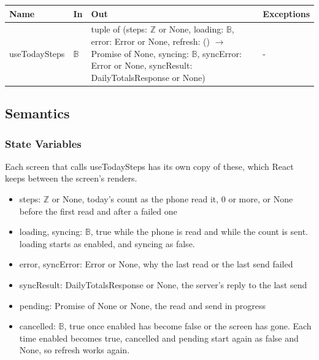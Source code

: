 \documentclass[12pt, titlepage]{article}
\begin{document}
\begin{center}
\small
\setlength{\tabcolsep}{3pt}
\begin{tabular}{>{\raggedright\arraybackslash}p{2.8cm}
  >{\raggedright\arraybackslash}p{1.2cm}
  >{\raggedright\arraybackslash}p{8.6cm}
  >{\raggedright\arraybackslash}p{2.2cm}}
\toprule
\textbf{Name} & \textbf{In} & \textbf{Out} & \textbf{Exceptions} \\
\midrule
useTodaySteps & $\mathbb{B}$ & tuple of (steps: $\mathbb{Z}$ or None, loading:
  $\mathbb{B}$, error: Error or None, refresh: () $\rightarrow$ Promise of
  None, syncing: $\mathbb{B}$, syncError: Error or None, syncResult:
  DailyTotalsResponse or None) & - \\
\bottomrule
\end{tabular}
\end{center}

\subsection{Semantics}

\subsubsection{State Variables}

Each screen that calls useTodaySteps has its own copy of these, which React
keeps between the screen's renders.

\begin{itemize}
\item steps: $\mathbb{Z}$ or None, today's count as the phone read it, 0 or
  more, or None before the first read and after a failed one
\item loading, syncing: $\mathbb{B}$, true while the phone is read and while
  the count is sent. loading starts as enabled, and syncing as false.
\item error, syncError: Error or None, why the last read or the last send
  failed
\item syncResult: DailyTotalsResponse or None, the server's reply to the last
  send
\item pending: Promise of None or None, the read and send in progress
\item cancelled: $\mathbb{B}$, true once enabled has become false or the screen
  has gone. Each time enabled becomes true, cancelled and pending start again
  as false and None, so refresh works again.
\end{itemize}
\end{document}

